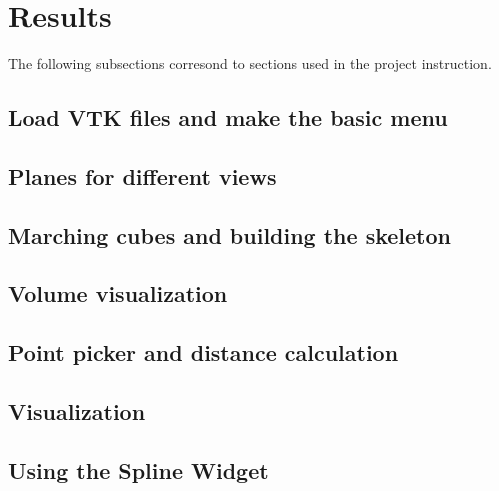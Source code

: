 \chapter{Results}
The following subsections corresond to sections used in the project instruction.



\section{Load VTK files and make the basic menu} 


\section{Planes for different views}


\section{Marching cubes and building the skeleton}


\section{Volume visualization}


\section{Point picker and distance calculation}


\section{Visualization}


\section{Using the Spline Widget}

